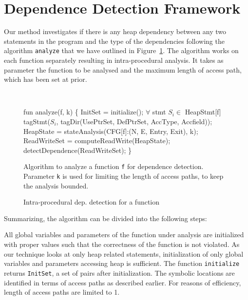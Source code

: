 \section{Dependence Detection Framework} 
\label{sec:depframework}
Our method investigates if there is any heap dependency between any two statements 
in the program and the type of the dependencies following the algorithm {\tt analyze} that 
we have outlined in Figure~\ref{fig:algoTopLevel}. The algorithm  works on each function 
separately resulting in intra-procedural analysis. It takes as parameter the function to be analysed  
and the maximum length of access path, which has been set at prior. 
\begin{figure}
\begin{framed}
{\tt
  \begin{program}{0}
  \FL fun analyze(f, k)  \{
   InitSet = initialize(); 
   $\forall$ stmt $S_i \in$ HeapStmt[f]
   tagStmt($S_i$, tagDir(UsePtrSet, DefPtrSet, AccType, Accfield));
   HeapState = stateAnalysis(CFG[f]:(N, E, Entry, Exit), k);
   ReadWriteSet = computeReadWrite(HeapState);
   detectDependence(ReadWriteSet);
   \}
  \end{program}
}
\end{framed}
  Algorithm to analyze a function {\tt f} for
    dependence detection. Parameter {\tt k} is used for
    limiting the length of access paths, to keep the analysis
    bounded. 
\caption{ Intra-procedural dep. detection for a function    
    \label{fig:algoTopLevel}}
\end{figure}
Summarizing, the algorithm can be divided into the following steps:

All global variables and parameters of the function under analysis are initialized 
with proper values such that the correctness of the function is not violated. As our technique
looks at only heap related statements, initialization of only global variables and parameters accessing heap 
is sufficient. The function {\tt initialize} returns {\tt InitSet}, a set of {\tt <heap directed pointer variable, symbolic location>} pairs after initialization. The symbolic locations are identified in terms of access paths as described earlier. For reasons of efficiency, length of access paths are limited to 1.

